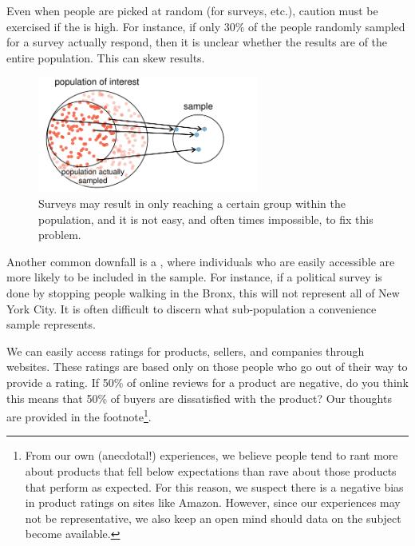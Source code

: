 Even when people are %
picked at random (for surveys, etc.), caution must be exercised if the   is high. For instance, if only 30\% of the people randomly sampled for a survey actually respond, then it is unclear whether the results are  of the entire population. This   can skew results.
\begin{figure}[h]
\centering
\includegraphics[height=1.5in]{01/figures/popToSample/surveySample}
\caption{Surveys may result in only reaching a certain group within the population, and it is not easy, and often times impossible, to fix this problem.}
\label{surveySample}
\end{figure}

Another common downfall is a , where individuals who are easily accessible are more likely to be included in the sample. For instance, if a political survey is done by stopping people walking in the Bronx, this will not represent all of New York City. It is often difficult to discern what sub-population a convenience sample represents.

\begin{exercise}
We can easily access ratings for products, sellers, and companies through websites. These ratings are based only on those people who go out of their way to provide a rating. If 50\% of online reviews for a product are negative, do you think this means that 50\% of buyers are dissatisfied with the product? Our thoughts are provided in the footnote\footnote{From our own (anecdotal!) experiences, we believe people tend to rant more about products that fell below expectations than rave about those products that perform as expected. For this reason, we suspect there is a negative bias in product ratings on sites like Amazon. However, since our experiences may not be representative, we also keep an open mind should data on the subject become available.}.
\end{exercise}


